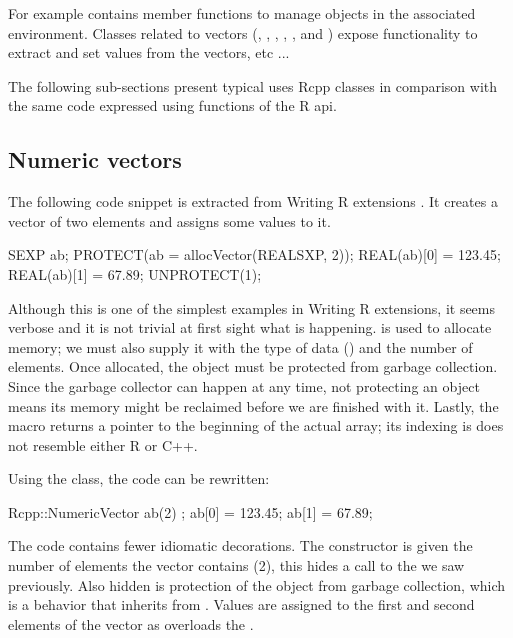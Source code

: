 For example  contains 
member functions to manage objects in the associated environment. 
Classes related to vectors (, , 
, , , 
 and ) expose functionality
to extract and set values from the vectors, etc ...

The following sub-sections present typical uses Rcpp classes in
comparison with the same code expressed using functions of the R api.

\subsection{Numeric vectors}

The following code snippet is extracted from Writing R extensions
\citep{R:exts}. It creates a  vector of two elements 
and assigns some values to it. 

\begin{example}
SEXP ab;
PROTECT(ab = allocVector(REALSXP, 2));
REAL(ab)[0] = 123.45;
REAL(ab)[1] = 67.89;
UNPROTECT(1);
\end{example}

Although this is one of the simplest examples in Writing R extensions, 
it seems verbose and it is not trivial at first sight what is happening.
 is used to allocate memory; we must also supply it with
the type of data () and the number of elements.  Once
allocated, the  object must be protected from garbage
collection. Since the garbage collector can happen at any time, not
protecting an object means its memory might be reclaimed before we are
finished with it. Lastly, the  macro returns a pointer to the
beginning of the actual array; its indexing is does not resemble either R or
C++.

Using the  class, the code can be rewritten: 

\begin{example}
Rcpp::NumericVector ab(2) ;
ab[0] = 123.45;
ab[1] = 67.89;
\end{example}

The code contains fewer idiomatic decorations. The 
constructor is given the number of elements the vector contains (2), this
hides a call to the  we saw previously. Also hidden is
protection of the object from garbage collection, which is a behavior that
 inherits from .  Values are assigned to
the first and second elements of the vector as  overloads
the .


